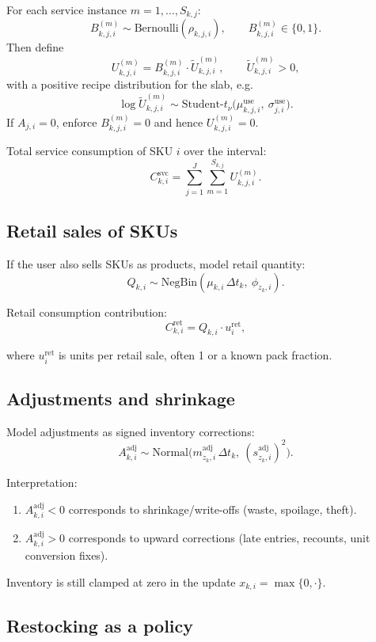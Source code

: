 \documentclass[11pt]{article}
\begin{document}
For each service instance $m=1,\dots,S_{k,j}$:
\[
  B^{(m)}_{k,j,i} \sim \text{Bernoulli}(\rho_{k,j,i}),\qquad B^{(m)}_{k,j,i} \in \{0,1\}.
\]
Then define
\[
  U^{(m)}_{k,j,i} = B^{(m)}_{k,j,i} \cdot \tilde U^{(m)}_{k,j,i},\qquad \tilde U^{(m)}_{k,j,i} > 0,
\]
with a positive recipe distribution for the slab, e.g.
\[
  \log \tilde U^{(m)}_{k,j,i} \sim \text{Student-}t_{\nu}\bigl(\mu^{\mathrm{use}}_{k,j,i},\ \sigma^{\mathrm{use}}_{j,i}\bigr).
\]
If $A_{j,i}=0$, enforce $B^{(m)}_{k,j,i}=0$ and hence $U^{(m)}_{k,j,i}=0$.

Total service consumption of SKU $i$ over the interval:
\[
  C^{\mathrm{svc}}_{k,i} = \sum_{j=1}^{J}\sum_{m=1}^{S_{k,j}} U^{(m)}_{k,j,i}.
\]

\subsection{Retail sales of SKUs}

If the user also sells SKUs as products, model retail quantity:
\[
  Q_{k,i} \sim \text{NegBin}(\mu_{k,i}\,\Delta t_k,\ \phi_{z_k,i}).
\]

Retail consumption contribution:
\[
  C^{\mathrm{ret}}_{k,i} = Q_{k,i} \cdot u^{\mathrm{ret}}_i,
\]

where $u^{\mathrm{ret}}_i$ is units per retail sale, often 1 or a known pack fraction.

\subsection{Adjustments and shrinkage}

Model adjustments as signed inventory corrections:
\[
  A^{\mathrm{adj}}_{k,i} \sim \text{Normal}\bigl(m^{\mathrm{adj}}_{z_k,i}\,\Delta t_k,\ (s^{\mathrm{adj}}_{z_k,i})^2\bigr).
\]

Interpretation:
\begin{enumerate}
  \item $A^{\mathrm{adj}}_{k,i}<0$ corresponds to shrinkage/write-offs (waste, spoilage, theft).
  \item $A^{\mathrm{adj}}_{k,i}>0$ corresponds to upward corrections (late entries, recounts, unit conversion fixes).
\end{enumerate}

Inventory is still clamped at zero in the update $x_{k,i}=\max\{0,\cdot\}$.

\subsection{Restocking as a policy}
\end{document}
